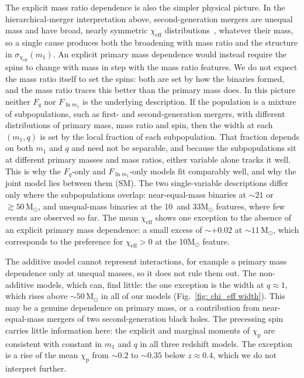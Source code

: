 \documentclass[%
    aps,
    prl,
    reprint,
    superscriptaddress,
    nolongbibliography,
    nobibnotes,
    nofootinbib,
    linenumbers,
    amsmath,amssymb,
]{revtex4-2}
\newcommand{\Msun}{\ensuremath{\mathrm{M}_{\odot}}}
\newcommand{\chieff}{\ensuremath{\chi_{\mathrm{eff}}}}
\newcommand{\chip}{\ensuremath{\chi_{\mathrm{p}}}}
\newcommand{\red}[1]{{\color{Red} #1}}
\newcommand{\featTen}{10\xspace}
\newcommand{\featTwenty}{21\xspace}
\newcommand{\featThirtyFive}{33\xspace}
\begin{document}
The explicit mass ratio dependence is also the simpler physical picture. In the hierarchical-merger interpretation above, second-generation mergers are unequal mass and have broad, nearly symmetric $\chieff$ distributions~\cite{Vijaykumar:2026zjy}, whatever their mass, so a single cause produces both the broadening with mass ratio and the structure in $\sigma_{\chieff}(m_1)$. An explicit primary mass dependence would instead require the spins to change with mass in step with the mass ratio features. We do not expect the mass ratio itself to set the spins: both are set by how the binaries formed, and the mass ratio traces this better than the primary mass does. \red{In this picture neither $F_q$ nor $F_{\ln m_1}$ is the underlying description. If the population is a mixture of subpopulations, such as first- and second-generation mergers, with different distributions of primary mass, mass ratio and spin, then the width at each $(m_1, q)$ is set by the local fraction of each subpopulation. That fraction depends on both $m_1$ and $q$ and need not be separable, and because the subpopulations sit at different primary masses and mass ratios, either variable alone tracks it well. This is why the $F_q$-only and $F_{\ln m_1}$-only models fit comparably well, and why the joint model lies between them (SM). The two single-variable descriptions differ only where the subpopulations overlap: near-equal-mass binaries at $\sim \featTwenty$ or $\gtrsim 50\,\Msun$, and unequal-mass binaries at the \featTen\ and \featThirtyFive $\Msun$ features, where few events are observed so far.} The mean $\chieff$ shows one exception to the absence of an explicit primary mass dependence: a small excess of $\sim +0.02$ at $\sim 11\,\Msun$, which corresponds to the preference for $\chieff > 0$ at the \featTen $\Msun$ feature.

The additive model cannot represent interactions, for example a primary mass dependence only at unequal masses, so it does not rule them out. The non-additive models, which can, find little: the one exception is the width at $q \approx 1$, which rises above $\sim 50\,\Msun$ in all of our models (Fig.~\ref{fig: chi_eff width}). This may be a genuine dependence on primary mass, or a contribution from near-equal-mass mergers of two second-generation black holes. The precessing spin carries little information here: the explicit and marginal moments of $\chip$ are consistent with constant in $m_1$ and $q$ in all three redshift models. The exception is a rise of the mean $\chip$ from $\sim 0.2$ to $\sim 0.35$ below $z \approx 0.4$, which we do not interpret further.
\end{document}
